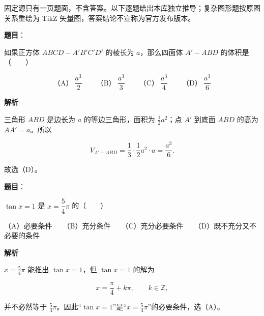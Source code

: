 

\begin{gktip}
固定源只有一页题面，不含答案。以下逐题给出本库独立推导；复杂图形题按原图关系重绘为 TikZ 矢量图，答案结论不宣称为官方发布版本。
\end{gktip}

\begin{answer}

\textbf{题目}：

如果正方体 $ABCD-A'B'C'D'$ 的棱长为 $a$，那么四面体 $A'-ABD$ 的体积是\mbox{（　　）}

\nopagebreak[4]
\[
\text{（A）}\ \frac{a^3}{2}
\qquad
\text{（B）}\ \frac{a^3}{3}
\qquad
\text{（C）}\ \frac{a^3}{4}
\qquad
\text{（D）}\ \frac{a^3}{6}
\]

\textbf{解析}

三角形 $ABD$ 是边长为 $a$ 的等边三角形，面积为 $\frac12a^2$；点 $A'$ 到底面 $ABD$ 的高为 $AA'=a$。所以

\nopagebreak[4]
\[
V_{A'-ABD}=\frac13\cdot\frac12a^2\cdot a=\frac{a^3}{6}.
\]

故选（D）。


\end{answer}
\begin{answer}

\textbf{题目}：

$\tan x=1$ 是 $x=\dfrac54\pi$ 的\mbox{（　　）}

（A）必要条件　　（B）充分条件　　（C）充分必要条件　　（D）既不充分又不必要的条件

\textbf{解析}

$x=\frac54\pi$ 能推出 $\tan x=1$，但 $\tan x=1$ 的解为

\nopagebreak[4]
\[
x=\frac\pi4+k\pi,\qquad k\in\mathbb Z,
\]

并不必然等于 $\frac54\pi$。因此“$\tan x=1$”是“$x=\frac54\pi$”的必要条件，选（A）。


\end{answer}
